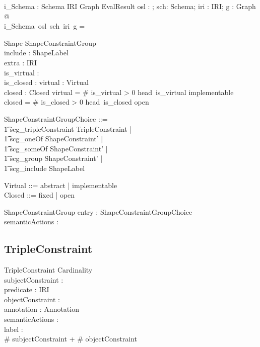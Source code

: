 \documentclass{article}
\begin{document}
\begin{axdef}
   i\_Schema : \optional[ShapeLabel] \fun Schema \fun IRI \fun Graph \fun EvalResult 
\where
   \forall osl : \optional[ShapeLabel]; sch: Schema; iri : IRI; g : Graph  @ \\
   i\_Schema~osl~sch~iri~g = 
\end{axdef}

\begin{schema}{Shape}
   ShapeConstraintGroup \\
   include : \power ShapeLabel \\
   extra : \power IRI \\
   is\_virtual : \optional[Virtual] \\
   is\_closed : \optional[Closed] 
\also
   virtual : Virtual \\
   closed : Closed
\where
   virtual = \IF \# is\_virtual > 0 \THEN head~is\_virtual \ELSE implementable \\
   closed = \IF \# is\_closed > 0 \THEN head~is\_closed \ELSE open
\end{schema}


\begin{zed}
ShapeConstraintGroupChoice ::= \\
\t1 scg\_tripleConstraint \ldata TripleConstraint \rdata | \\
\t1 scg\_oneOf \ldata ShapeConstraint' \rdata | \\
\t1 scg\_someOf \ldata ShapeConstraint' \rdata | \\
\t1 scg\_group \ldata ShapeConstraint' \rdata | \\
\t1 scg\_include \ldata ShapeLabel \rdata
\end{zed}
\begin{zed}
Virtual ::= abstract | implementable \\
Closed ::= fixed | open \\
\end{zed}

\begin{schema}{ShapeConstraintGroup}
   entry : \power ShapeConstraintGroupChoice \\
   semanticActions :  \optional[SemanticActions] 
\end{schema}
\subsection{TripleConstraint}

\begin{schema}{TripleConstraint}
   Cardinality \\
   subjectConstraint : \optional[ValueClass] \\
   predicate : IRI \\
   objectConstraint : \optional[ValueClass] \\
   annotation : \power Annotation \\
   semanticActions : \optional[SemanticActions] \\
   label : \optional[ShapeLabel] \\
\where
   \# subjectConstraint + \# objectConstraint 
\end{schema}
\end{document}
